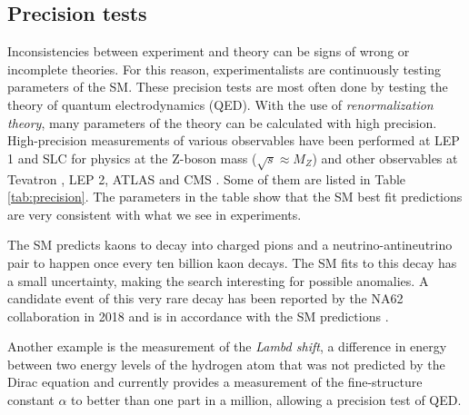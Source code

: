 \subsection{Precision tests}



Inconsistencies between experiment and theory can be signs of wrong or incomplete theories. For this reason, experimentalists are continuously testing parameters of the SM. These precision tests are most often done by testing the theory of quantum electrodynamics (QED). With the use of \textit{renormalization theory}, many parameters of the theory can be calculated with high precision. High-precision measurements of various observables have been performed at LEP 1 and SLC \cite{ALEPH:2005ab,Riemann:2010zz,Abe:2000dq,Abe:2000uc,Abe:2000hk,Abe:1996ef} for physics at the Z-boson mass ($\sqrt{s} \approx M_Z$) and other observables at Tevatron \cite{Aaltonen:2013iut,TEW:2010aj}, LEP 2\cite{TEW:2010aj}, ATLAS \cite{Aaboud:2017svj,ATLASurl1} and CMS \cite{CMSurl1,CMSurl2}. Some of them are listed in Table \ref{tab:precision}. The parameters in the table show that the SM best fit predictions are very consistent with what we see in experiments.

The SM predicts kaons to decay into charged pions and a neutrino-antineutrino pair to happen once every ten billion kaon decays. The SM fits to this decay has a small uncertainty, making the search interesting for possible anomalies. A candidate event of this very rare decay has been reported by the NA62 collaboration in 2018 and is in accordance with the SM predictions \cite{na62}.

Another example is the measurement of the \textit{Lambd shift}, a difference in energy between two energy levels of the hydrogen atom that was not predicted by the Dirac equation and currently provides a measurement of the fine-structure constant $\alpha$ to better than one part in a million, allowing a precision test of QED.

